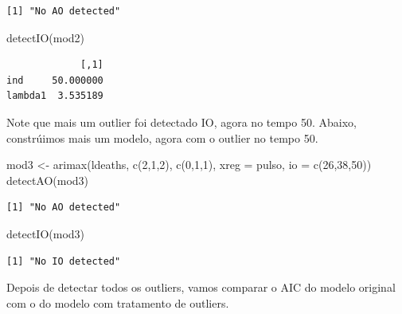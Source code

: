\documentclass[
  letterpaper,
  DIV=11,
  numbers=noendperiod]{scrartcl}
\newenvironment{Shaded}{\begin{snugshade}}{\end{snugshade}}
\newcommand{\AttributeTok}[1]{\textcolor[rgb]{0.40,0.45,0.13}{#1}}
\newcommand{\DecValTok}[1]{\textcolor[rgb]{0.68,0.00,0.00}{#1}}
\newcommand{\FunctionTok}[1]{\textcolor[rgb]{0.28,0.35,0.67}{#1}}
\newcommand{\NormalTok}[1]{\textcolor[rgb]{0.00,0.23,0.31}{#1}}
\newcommand{\OtherTok}[1]{\textcolor[rgb]{0.00,0.23,0.31}{#1}}
\newcommand{\SpecialCharTok}[1]{\textcolor[rgb]{0.37,0.37,0.37}{#1}}
\theoremstyle{definition}
\theoremstyle{definition}
\theoremstyle{plain}
\theoremstyle{plain}
\theoremstyle{remark}
\begin{document}
\begin{verbatim}
[1] "No AO detected"
\end{verbatim}

\begin{Shaded}
\begin{Highlighting}[]
\FunctionTok{detectIO}\NormalTok{(mod2)}
\end{Highlighting}
\end{Shaded}

\begin{verbatim}
             [,1]
ind     50.000000
lambda1  3.535189
\end{verbatim}

Note que mais um outlier foi detectado IO, agora no tempo 50. Abaixo,
constrúimos mais um modelo, agora com o outlier no tempo 50.

\begin{Shaded}
\begin{Highlighting}[]
\NormalTok{mod3 }\OtherTok{\textless{}{-}} \FunctionTok{arimax}\NormalTok{(ldeaths, }\FunctionTok{c}\NormalTok{(}\DecValTok{2}\NormalTok{,}\DecValTok{1}\NormalTok{,}\DecValTok{2}\NormalTok{), }\FunctionTok{c}\NormalTok{(}\DecValTok{0}\NormalTok{,}\DecValTok{1}\NormalTok{,}\DecValTok{1}\NormalTok{), }\AttributeTok{xreg =}\NormalTok{ pulso, }\AttributeTok{io =} \FunctionTok{c}\NormalTok{(}\DecValTok{26}\NormalTok{,}\DecValTok{38}\NormalTok{,}\DecValTok{50}\NormalTok{))}
\FunctionTok{detectAO}\NormalTok{(mod3)}
\end{Highlighting}
\end{Shaded}

\begin{verbatim}
[1] "No AO detected"
\end{verbatim}

\begin{Shaded}
\begin{Highlighting}[]
\FunctionTok{detectIO}\NormalTok{(mod3)}
\end{Highlighting}
\end{Shaded}

\begin{verbatim}
[1] "No IO detected"
\end{verbatim}

Depois de detectar todos os outliers, vamos comparar o AIC do modelo
original com o do modelo com tratamento de outliers.

\begin{Shaded}
\end{Shaded}
\end{document}
